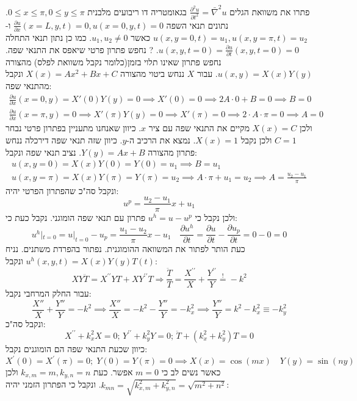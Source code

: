 \documentclass{tstextbook}
\begin{document}
פתרו את משוואת הגלים \(\frac{\partial ^2u}{\partial t^2}=\bar{\nabla}^2u\) בגאומטריה דו ריבועים מלבנית \(0\leq x\leq \pi,0\leq y\leq \pi\). נתונים תנאי השפה \(\frac{\partial u}{\partial x}(x=L,y,t)=0,u(x=0,y,t)=0\) ו-\(u(x,y=0,t)=u_{1},u\left( x,y=\pi,t \right)=u_{2}\) כאשר \(u_{1},u_{2}\neq 0\). כמו כן נתון תנאי התחלה \(u(x,y,t=0)=\frac{\partial u}{\partial t}(x,y,t=0)=0\).
?
נחפש פתרון פרטי שיאפס את התנאי שפה. נחפש פתרון שאינו תלוי בזמן(כלומר נקבל משוואת לפלס) מהצורה \(u(x,y)=X(x)Y(y)\). עבור \(X\) ננחש ביטוי מהצורה \(X(x)=Ax^2+Bx+C\) ונקבל מהתנאי שפה:
\begin{gather*} \frac{\partial u}{\partial x} (x=0,y)=X'(0)Y(y)=0\implies X'(0)=0\implies 2A\cdot 0+B=0\implies B=0 \\ \frac{\partial u}{\partial x} \left( x=\pi,y \right)=0\implies X'\left( \pi \right)Y(y)=0\implies X'\left( \pi \right)=0\implies 2\cdot A\cdot \pi =0\implies A=0
 \end{gather*}
 ולכן \(X(x)=C\) מקיים את התנאי שפה עם ציר \(x\). כיוון שאנחנו מתעניין בפתרון פרטי נבחר \(C=1\) ולכן נקבל \(X(x)=1\). נמצא את הרכיב ה-\(y\). כיוון שזה תנאי שפה דירכלה ננחש פתרון מהצורה \(Y(y)=Ax+B\). נציב תנאי שפה ונקבל:
 \begin{gather*}   u(x,y=0)=X(x)Y(0)=Y(0)=u_{1}\implies B=u_{1} \\u\left( x,y=\pi \right) =X(x)Y\left( \pi \right)=Y\left( \pi \right)=u_{2}\implies A\cdot \pi + u_{1}=u_{2}\implies A=\frac{u_{2} -u_{1}}{\pi}
 \end{gather*}
ונקבל סה"כ שהפתרון הפרטי יהיה:
$$u^p=\frac{u_{2}-u_{1}}{\pi}x+u_{1}$$
ולכן נקבל כי \(u^h=u-u^p\) פתרון עם תנאי שפה הומוגני. נקבל כעת כי:
$$u^h|_{t=0}=u|_{t=0}-u_{p}=\frac{u_{1}-u_{2}}{\pi}x-u_{1}\quad \frac{\partial u^h}{\partial t}=\frac{\partial u}{\partial t} -\frac{\partial u_{p}}{\partial t} =0 -0=0$$
כעת הותר לפתור את המשוואה ההומוגנית. נפתור בהפרדת משתנים. נניח \(u^h(x,y,t)=X(x)Y(y)T(t)\) ונקבל:
$$X Y{\ddot{T}}=X^{\prime\prime}Y T+X Y^{\prime\prime}T\Rightarrow{\frac{\ddot{T}}{T}}={\frac{X^{\prime\prime}}{X}}+{\frac{Y^{\prime\prime}}{Y}}\stackrel{!}{=}-k^{2}$$
עבור החלק המרחבי נקבל:
$$\frac{X''}{X}+\frac{Y''}{Y}=-k^2\implies \frac{X''}{X}=-k^2-\frac{Y''}{Y}=-k_{x}^2\implies \frac{Y''}{Y}=k^2-k_{x}^2\equiv -k_{y}^2$$
ונקבל סה"כ:
$$X^{\prime\prime}+k_{x}^{2}X=0;\,Y^{\prime\prime}+k_{y}^{2}Y=0;\,\ddot{T}+\left(k_{x}^{2}+k_{y}^{2}\right)T=0$$
כיוון שכעת התנאי שפה הם הומוגנים נקבל:
$$X^{\prime}\left(0\right)=X^{\prime}\left(\pi\right)=0;\;Y\left(0\right)=Y\left(\pi\right)=0\implies X(x)=\cos(mx)\quad Y(y)=\sin(ny)$$
כאשר נשים לב כי \(m=0\) אפשר. כעת \(k_{x,m}=m,k_{y,n}=n\) ולכן \(k_{mn}=\sqrt{ k_{x,m}^2+k_{y,n}^2 }=\sqrt{ m^2+n^2 }\). ונקבל כי הפתרון הזמני יהיה:
\end{document}
